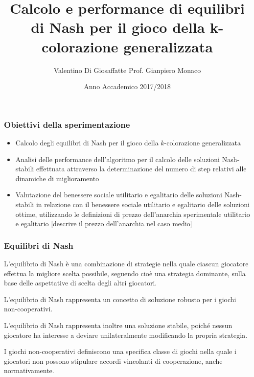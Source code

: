 \documentclass{beamer}
\title{Calcolo e performance di equilibri di Nash per il gioco della k-colorazione generalizzata}
\author{Valentino Di Giosaffatte \hfill Prof. Gianpiero Monaco}
\institute{Università degli Studi dell'Aquila}
\date{Anno Accademico 2017/2018}
\begin{document}
\frame{\titlepage}


\begin{frame}
\frametitle{Obiettivi della sperimentazione}
\begin{itemize}
	\item Calcolo degli equilibri di Nash per il gioco della $k$-colorazione generalizzata
	\item Analisi delle performance dell'algoritmo per il calcolo delle soluzioni Nash-stabili effettuata attraverso la determinazione del numero di step relativi alle dinamiche di miglioramento
	\item Valutazione del benessere sociale utilitario e egalitario delle soluzioni Nash-stabili in relazione con il benessere sociale utilitario e egalitario delle soluzioni ottime, utilizzando le definizioni di prezzo dell'anarchia sperimentale utilitario e egalitario [descrive il prezzo dell'anarchia nel caso medio]
\end{itemize}
\end{frame}


%
%


\begin{frame}
\frametitle{Equilibri di Nash}
L'equilibrio di Nash è una combinazione di strategie nella quale ciascun giocatore effettua la migliore scelta possibile, seguendo cioè una \alert{strategia dominante}, sulla base delle aspettative di scelta degli altri giocatori.\medskip

L'equilibrio di Nash rappresenta un \alert{concetto di soluzione} robusto per i giochi non-cooperativi.\medskip

L'equilibrio di Nash rappresenta inoltre una \alert{soluzione stabile}, poiché nessun giocatore ha interesse a deviare unilateralmente modificando la propria strategia.\medskip

I \alert{giochi non-cooperativi} definiscono una specifica classe di giochi nella quale i giocatori non possono stipulare accordi vincolanti di cooperazione, anche normativamente.
\end{frame}
\end{document}
